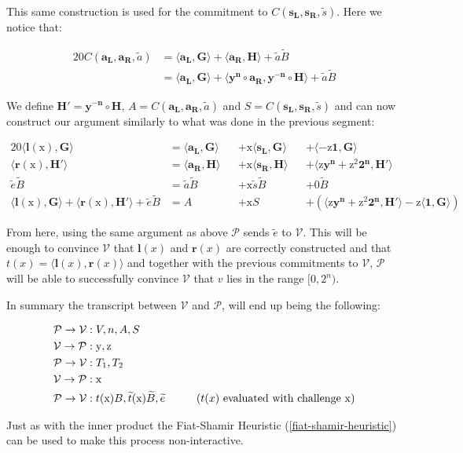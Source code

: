 \documentclass{article}
\newcommand{\eq}[1]{\begin{alignat*}{20}#1\end{alignat*}}
\renewcommand{\vec}[1]{\boldsymbol{#1}}
\newcommand{\ran}[1]{\mathrm{#1}}
\newcommand{\vecran}[1]{\mathbf{#1}}
\newcommand{\V}{\mathcal{V}}
\renewcommand{\P}{\mathcal{P}}
\newcommand{\dotp}[2]{\langle #1, #2 \rangle}
\newcommand{\opn}[1]{\operatorname{#1}}
\newcommand{\vecl}[1]{\vec{#1_{\opn{L}}}}
\newcommand{\vecr}[1]{\vec{#1_{\opn{R}}}}
\newcommand{\tB}{\widetilde{B}}
\renewcommand{\tt}{\widetilde{t}}
\begin{document}
This same construction is used for the commitment to $C(\vecl{s},
\vecr{s}, \widetilde{s})$. Here we notice that:

\eq{
	C(\vecl{a}, \vecr{a}, \widetilde{a}) &= \dotp{\vecl{a}}{\vec{G}} + \dotp{\vecr{a}}{\vec{H}} + \widetilde{a}\tB \\
	&= \dotp{\vecl{a}}{\vec{G}} + \dotp{\vecran{y^n}\circ \vecr{a}}{\vecran{y^{-n}}\circ \vec{H}} + \widetilde{a}\tB
}

We define $\vec{H'} = \vecran{y^{-n}}\circ\vec{H}$, $A = C(\vecl{a},\vecr{a}, \widetilde{a})$ and $S = C(\vecl{s}, \vecr{s}, \widetilde{s})$ and can now construct our argument similarly to what was done in the previous segment:

\eq{
	\dotp{\vec{l}(\ran{x})}{\vec{G}} &= \dotp{\vecl{a}}{\vec{G}} &&+ \ran{x}\dotp{\vecl{s}}{\vec{G}} &&+ \dotp{-\ran{z}\vec{1}}{\vec{G}} \\
	\dotp{\vec{r}(\ran{x})}{\vec{H'}} &= \dotp{\vecr{a}}{\vec{H}} &&+ \ran{x}\dotp{\vecr{s}}{\vec{H}} &&+ \dotp{\ran{z}\vecran{y^n} + \ran{z^2}\vec{2^n}}{\vec{H'}}\\
	\widetilde{e}\tB &= \widetilde{a}\tB &&+ \ran{x}\widetilde{s}\tB &&+ 0 \tB \\
	\dotp{\vec{l}(\ran{x})}{\vec{G}} + \dotp{\vec{r}(\ran{x})}{\vec{H'}} + \widetilde{e}\tB &= A &&+ \ran{x}S &&+ (\dotp{\ran{z}\vecran{y^n} + \ran{z^2}\vec{2^n}}{\vec{H'}} - \ran{z}\dotp{\vec{1}}{\vec{G}})
}

From here, using the same argument as above $\P$ sends $\widetilde{e}$ to $\V$. This will be enough to convince $\V$ that $\vec{l}(x)$ and $\vec{r}(x)$ are correctly constructed and that $t(x) = \dotp{\vec{l}(x)}{\vec{r}(x)}$ and together with the previous commitments to $\V$, $\P$ will be able to successfully convince $\V$ that $v$ lies in the range $[0, 2^n)$.

In summary the transcript between $\V$ and $\P$, will end up being the following:

\eq{
	\P \rightarrow \V &: V, n, A, S \\
	\V \rightarrow \P &: \ran{y}, \ran{z} \\
	\P \rightarrow \V &: T_1, T_2 \\
	\V \rightarrow \P &: \ran{x} \\
	\P \rightarrow \V &: t(\ran{x})B, \tt(\ran{x})\tB, \widetilde{e} \hspace*{1cm}\text{($t(x)$ evaluated with challenge $\ran{x}$)}\\
}

Just as with the inner product the Fiat-Shamir Heuristic (\ref{fiat-shamir-heuristic}) can be used to make this process non-interactive.
\end{document}

